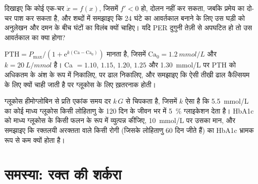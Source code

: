 \begin{exercise}[$\star\star\star$]\label{exo:b3:endocrinology:10}
दिखाइए कि कोई एक-चर  $\dot x = f(x)$, जिसमें
$f' < 0$ हो, दोलन नहीं कर सकता, जबकि प्रमेय का दो-चर पाश कर सकता है, और शब्दों में
समझाइए कि 24 घंटे का आवर्तकाल बनाने के लिए उस घड़ी को अनुलेखन और दमन के
बीच घंटों का विलंब क्यों चाहिए। यदि PER दुगुनी तेज़ी से अपघटित हो तो
उस आवर्तकाल का क्या होगा?
\end{exercise}

\begin{exercise}[$\star\star\star$]\label{exo:b3:endocrinology:11}
 $\text{PTH} = P_{\max}/(1 +
\mathrm{e}^{k(\text{Ca} - \text{Ca}_{0})})$ मानता है, जिसमें $\text{Ca}_{0} =
\qty{1.2}{mmol/L}$ और $k = \qty{20}{L/mmol}$ है। Ca
$= 1.10$, $1.15$, $1.20$, $1.25$ और \qty{1.30}{mmol/L} पर PTH को अधिकतम
के अंश के रूप में निकालिए,  पर ढाल निकालिए, और समझाइए कि ऐसी
तीखी ढाल कैल्सियम के लिए क्यों चाही जाती है पर ग्लूकोस के लिए
ख़तरनाक होती।
\end{exercise}

\begin{exercise}[$\star\star\star$]\label{exo:b3:endocrinology:12}
ग्लूकोस हीमोग्लोबिन से प्रति एकांक समय दर $k\,G$ से चिपकता है, जिसमें
$k$ ऐसा है कि \qty{5.5}{mmol/L} का कोई माध्य ग्लूकोस किसी लोहिताणु के
120 दिन के जीवन भर में \qty{5}{\%} ग्लाइकेशन देता है। HbA1c को माध्य
ग्लूकोस के किसी फलन के रूप में व्युत्पन्न कीजिए, \qty{10}{mmol/L} पर
उसका मान, और समझाइए कि रक्तलयी अरक्तता वाले किसी रोगी (जिसके लोहिताणु
60 दिन जीते हैं) का HbA1c भ्रामक रूप से कम क्यों होता है।
\end{exercise}

\section{समस्या: रक्त की शर्करा}

